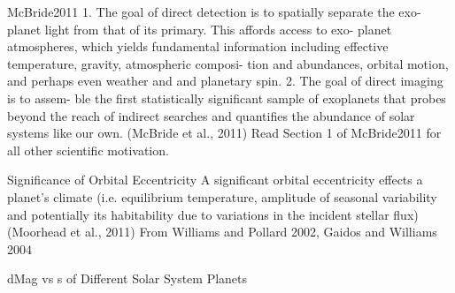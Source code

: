 \documentclass[aspectratio=169]{beamer}
\begin{document}
\begin{frame}{McBride2011}
1. The goal of direct detection is to spatially separate the exo-
planet light from that of its primary. This affords access to exo- planet atmospheres, which yields fundamental information including effective temperature, gravity, atmospheric composi- tion and abundances, orbital motion, and perhaps even weather
and and planetary spin.
2. The goal of direct imaging is to assem- ble the first statistically significant sample of exoplanets that probes beyond the reach of indirect searches and quantifies the abundance of solar systems like our own.
(McBride et al., 2011)%
Read Section 1 of McBride2011 for all other scientific motivation.
\end{frame}

\begin{frame}{Significance of Orbital Eccentricity}
A significant orbital eccentricity effects a planet's climate (i.e. equilibrium temperature, amplitude of seasonal variability and potentially its habitability due to variations in the incident stellar flux) (Moorhead et al., 2011)
From Williams and Pollard 2002, Gaidos and Williams 2004
\end{frame}



\begin{frame}{dMag vs s of Different Solar System Planets}
    
\end{frame}
\end{document}

